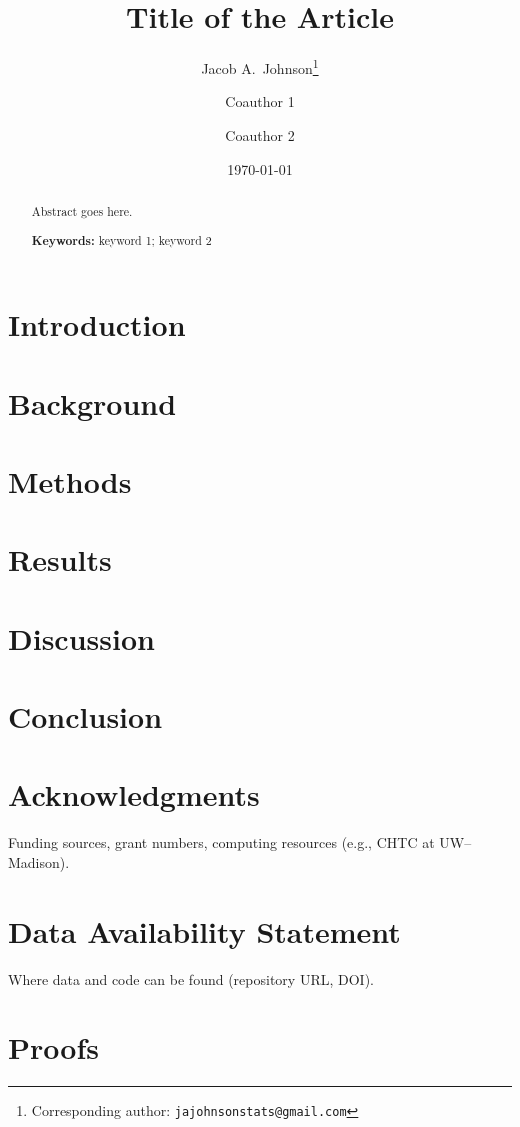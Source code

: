 \documentclass[12pt]{article}                %
\title{Title of the Article}
\author[1]{Jacob A.\ Johnson\thanks{Corresponding author: \texttt{jajohnsonstats@gmail.com}}}
\author[1]{Coauthor 1}
\author[2]{Coauthor 2}
\affil[1]{Department of Statistics, University of Wisconsin--Madison}
\affil[2]{Their Affiliation}
\date{\today}
\begin{document}
	\maketitle

	\begin{abstract}
		Abstract goes here.

		\medskip
		\noindent\textbf{Keywords:} keyword 1; keyword 2
	\end{abstract}

	\section{Introduction}
	\label{sec:intro}
	

	\section{Background}
	\label{sec:background}
	

	\section{Methods}
	\label{sec:methods}
	

	\section{Results}
	\label{sec:results}
	

	\section{Discussion}
	\label{sec:discussion}
	

	\section{Conclusion}
	\label{sec:conclusion}
	

	\section*{Acknowledgments}
	Funding sources, grant numbers, computing resources (e.g., CHTC at UW--Madison).

	\section*{Data Availability Statement}
	Where data and code can be found (repository URL, DOI).


	\appendix
	\section{Proofs}
	\label{app:proofs}
\end{document}
